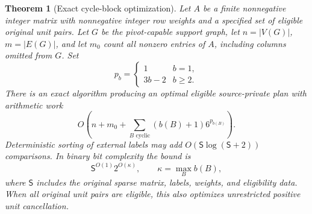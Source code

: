 \documentclass[11pt,letterpaper]{article}
\newtheorem{theorem}{Theorem}[section]
\theoremstyle{definition}
\theoremstyle{remark}
\newcommand{\size}{\mathsf S}
\begin{document}
\begin{theorem}[Exact cycle-block optimization]
\label{thm:main}
Let $A$ be a finite nonnegative integer matrix with nonnegative integer row weights and a specified set of eligible original unit pairs. Let $G$ be the pivot-capable support graph, let $n=|V(G)|$, $m=|E(G)|$, and let $m_0$ count all nonzero entries of $A$, including columns omitted from $G$. Set
\[
 p_b=\begin{cases}1&b=1,\\3b-2&b\ge2.\end{cases}
\]
There is an exact algorithm producing an optimal eligible source-private plan with arithmetic work
\begin{equation}
 O\!\left(n+m_0+\sum_{B\text{ cyclic}}(b(B)+1)6^{p_{b(B)}}\right).
 \label{eq:work}
\end{equation}
Deterministic sorting of external labels may add $O(\size\log(\size+2))$ comparisons. In binary bit complexity the bound is
\begin{equation}
 \size^{O(1)}2^{O(\kappa)},\qquad \kappa=\max_B b(B),
 \label{eq:fpt}
\end{equation}
where $\size$ includes the original sparse matrix, labels, weights, and eligibility data. When all original unit pairs are eligible, this also optimizes unrestricted positive unit cancellation.
\end{theorem}
\end{document}

